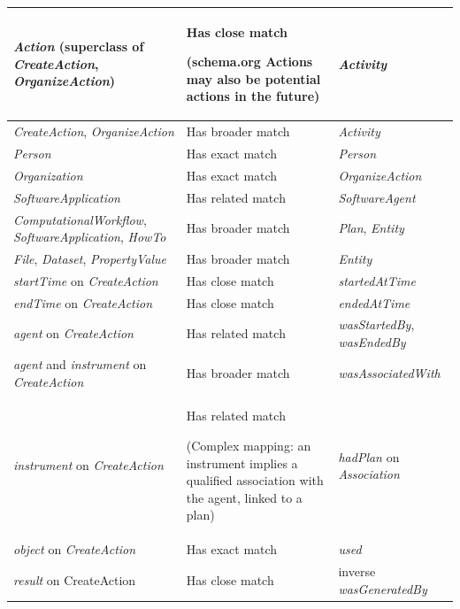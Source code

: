\documentclass[10pt,letterpaper]{article}
\begin{document}
\begin{table}[!ht]
\begin{adjustwidth}{-1.5cm}{0in}
\begin{tabular}{p{35mm}|p{40mm}|p{40mm}}
  \emph{Action} (superclass of \emph{CreateAction}, \emph{OrganizeAction}) & 
    Has close match 
    \begin{small}
      (schema.org Actions may also be potential actions in the future)
    \end{small}
    & 
    \emph{Activity}
    \\ \hline
  \emph{CreateAction}, \emph{OrganizeAction} & 
    Has broader match & 
    \emph{Activity}
    \\ \hline
  \emph{Person} & 
    Has exact match & 
    \emph{Person}
    \\ \hline
  \emph{Organization} & 
    Has exact match & 
    \emph{OrganizeAction} 
    \\ \hline
  \emph{SoftwareApplication} & 
    Has related match & 
    \emph{SoftwareAgent}
    \\ \hline
  \emph{ComputationalWorkflow}, \emph{SoftwareApplication}, \emph{HowTo} & 
    Has broader match & 
    \emph{Plan},
    \emph{Entity}
    \\ \hline
  \emph{File}, \emph{Dataset}, \emph{PropertyValue} & 
    Has broader match & 
    \emph{Entity}
    \\ \hline
  \emph{startTime} on \emph{CreateAction} & 
    Has close match & 
    \emph{startedAtTime}
    \\ \hline
  \emph{endTime} on \emph{CreateAction} & 
    Has close match & 
    \emph{endedAtTime}
    \\ \hline
  \emph{agent} on \emph{CreateAction} & 
    Has related match & 
    \emph{wasStartedBy}, \emph{wasEndedBy}
    \\ \hline
  \emph{agent} and \emph{instrument} on \emph{CreateAction} & 
    Has broader match & 
    \emph{wasAssociatedWith}
    \\ \hline
  \emph{instrument} on \emph{CreateAction} & 
    Has related match 
    \begin{small}
      (Complex mapping: an instrument implies a qualified association with the agent, linked to a plan)
    \end{small}
    & 
    \emph{hadPlan} on \emph{Association}
    \\ \hline

  \emph{object} on \emph{CreateAction} &
    Has exact match & 
    \emph{used} 
    \\ \hline
  \emph{result} on CreateAction & 
    Has close match & 
    inverse \emph{wasGeneratedBy} 
  
  \end{tabular}
  \label{rocrate_prov_mapping}
  \end{adjustwidth}
\end{table}
  
\end{document}
